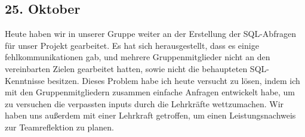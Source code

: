 \subsection{25. Oktober}
Heute haben wir in unserer Gruppe weiter an der Erstellung der SQL-Abfragen für unser Projekt gearbeitet. Es hat sich herausgestellt, dass es einige fehlkommunikationen gab, und mehrere Gruppenmitglieder nicht an den vereinbarten Zielen gearbeitet hatten, sowie nicht die behaupteten SQL-Kenntnisse besitzen. Dieses Problem habe ich heute versucht zu lösen, indem ich mit den Gruppenmitgliedern zusammen einfache Anfragen entwickelt habe, um zu versuchen die verpassten inputs durch die Lehrkräfte wettzumachen. Wir haben uns außerdem mit einer Lehrkraft getroffen, um einen Leistungsnachweis zur Teamreflektion zu planen.